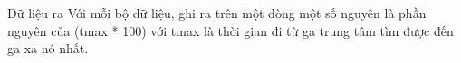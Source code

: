 Dữ liệu ra
Với mỗi bộ dữ liệu, ghi ra trên một dòng một số nguyên là phần nguyên của (tmax * 100) với tmax là thời gian đi từ ga trung tâm tìm được đến ga xa nó nhất.